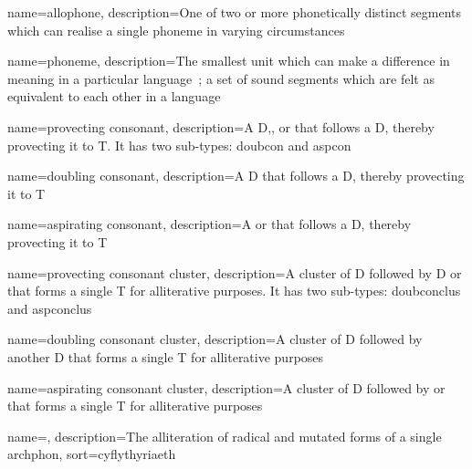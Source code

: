 \usepackage[%
            xindy,
            toc,
            ]{glossaries}
\usepackage{glossary-mcols}

\makeglossaries
\usepackage[xindy]{imakeidx}
\makeindex


%
{
  name=allophone,
  description={One of two or more phonetically distinct segments which can realise a single phoneme in varying circumstances~\autocite[s.v.~\emph{allophone}]{Tra_dictionary96}}
}

%
{
  name=phoneme,
  description={The smallest unit which can make a difference in meaning in a particular language~\autocite[s.v.~\emph{phoneme}]{Tra_dictionary96}; a set of sound segments which are felt as equivalent to each other in a language}
}

{
    name=provecting consonant,
    description={A \gls{D},, or  that follows a \gls{D}, thereby provecting it to \gls{T}. It has two sub-types: \gls{doubcon} and \gls{aspcon}}
}

{
    name=doubling consonant,
    description={A \gls{D} that follows a \gls{D}, thereby provecting it to \gls{T}}
}

{
    name=aspirating consonant,
    description={A  or  that follows a \gls{D}, thereby provecting it to \gls{T}}
}

{
    name=provecting consonant cluster,
    description={A cluster of \gls{D} followed by \gls{D} or  that forms a single \gls{T} for alliterative purposes. It has two sub-types: \gls{doubconclus} and \gls{aspconclus}}
}

{
    name=doubling consonant cluster,
    description={A cluster of \gls{D} followed by another \gls{D} that forms a single \gls{T} for alliterative purposes}
}

{
    name=aspirating consonant cluster,
    description={A cluster of \gls{D} followed by  or  that forms a single \gls{T} for alliterative purposes}
}

{
    name={},
    description={The alliteration of radical and mutated forms of a single \gls{archphon}},
    sort={cyflythyriaeth}
}

